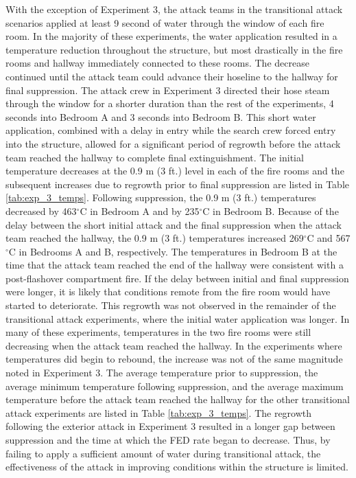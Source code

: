 \documentclass[12pt,oneside]{article}
\begin{document}
With the exception of Experiment 3, the attack teams in the transitional attack scenarios applied at least 9 second of water through the window of each fire room. In the majority of these experiments, the water application resulted in a temperature reduction throughout the structure, but most drastically in the fire rooms and hallway immediately connected to these rooms. The decrease continued until the attack team could advance their hoseline to the hallway for final suppression.  The attack crew in Experiment 3 directed their hose steam through the window for a shorter duration than the rest of the experiments, 4 seconds into Bedroom A and 3 seconds into Bedroom B. This short water application, combined with a delay in entry while the search crew forced entry into the structure, allowed for a significant period of regrowth before the attack team reached the hallway to complete final extinguishment. The initial temperature decreases at the 0.9 m (3 ft.) level in each of the fire rooms and the subsequent increases due to regrowth prior to final suppression are listed in Table \ref{tab:exp_3_temps}. Following suppression, the 0.9 m (3 ft.) temperatures decreased by 463$^{\circ}$C in Bedroom A and by 235$^{\circ}$C in Bedroom B. Because of the delay between the short initial attack and the final suppression when the attack team reached the hallway, the 0.9 m (3 ft.) temperatures increased 269$^{\circ}$C and 567$^{\circ}$C in Bedrooms A and B, respectively. The temperatures in Bedroom B at the time that the attack team reached the end of the hallway were consistent with a post-flashover compartment fire. If the delay between initial and final suppression were longer, it is likely that conditions remote from the fire room would have started to deteriorate. This regrowth was not observed in the remainder of the transitional attack experiments, where the initial water application was longer. In many of these experiments, temperatures in the two fire rooms were still decreasing when the attack team reached the hallway. In the experiments where temperatures did begin to rebound, the increase was not of the same magnitude noted in Experiment 3. The average temperature prior to suppression, the average minimum temperature following suppression, and the average maximum temperature before the attack team reached the hallway for the other transitional attack experiments are listed in Table \ref{tab:exp_3_temps}. The regrowth following the exterior attack in Experiment 3 resulted in a longer gap between suppression and the time at which the FED rate began to decrease. Thus, by failing to apply a sufficient amount of water  during transitional attack, the effectiveness of the attack in improving conditions within the structure is limited. 
\end{document}
